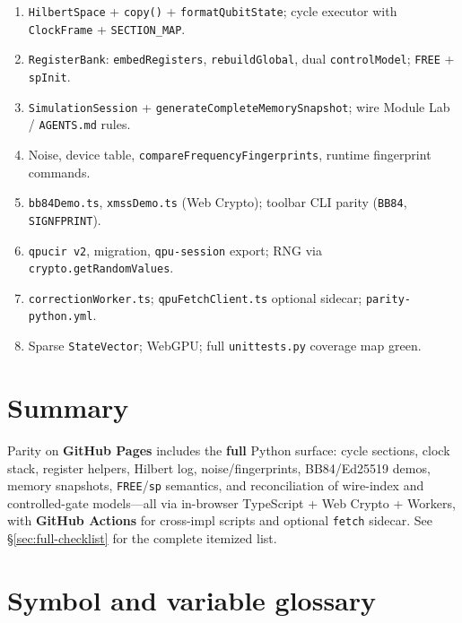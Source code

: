\documentclass[11pt,a4paper]{article}
\begin{document}
\begin{enumerate}[label=\textbf{Phase \Roman*.}]
  \item \texttt{HilbertSpace} + \texttt{copy()} + \texttt{formatQubitState}; cycle executor with \texttt{ClockFrame} + \texttt{SECTION\_MAP}.
  \item \texttt{RegisterBank}: \texttt{embedRegisters}, \texttt{rebuildGlobal}, dual \texttt{controlModel}; \texttt{FREE} + \texttt{spInit}.
  \item \texttt{SimulationSession} + \texttt{generateCompleteMemorySnapshot}; wire Module Lab / \texttt{AGENTS.md} rules.
  \item Noise, device table, \texttt{compareFrequencyFingerprints}, runtime fingerprint commands.
  \item \texttt{bb84Demo.ts}, \texttt{xmssDemo.ts} (Web Crypto); toolbar CLI parity (\texttt{BB84}, \texttt{SIGNFPRINT}).
  \item \texttt{qpucir v2}, migration, \texttt{qpu-session} export; RNG via \texttt{crypto.getRandomValues}.
  \item \texttt{correctionWorker.ts}; \texttt{qpuFetchClient.ts} optional sidecar; \texttt{parity-python.yml}.
  \item Sparse \texttt{StateVector}; WebGPU; full \texttt{unittests.py} coverage map green.
\end{enumerate}

\section{Summary}

Parity on \textbf{GitHub Pages} includes the \textbf{full} Python surface: cycle sections, clock stack, register helpers, Hilbert log, noise/fingerprints, BB84/Ed25519 demos, memory snapshots, \texttt{FREE}/\texttt{sp} semantics, and reconciliation of wire-index and controlled-gate models---all via in-browser TypeScript + Web Crypto + Workers, with \textbf{GitHub Actions} for cross-impl scripts and optional \texttt{fetch} sidecar. See \S\ref{sec:full-checklist} for the complete itemized list.

\appendix
\section{Symbol and variable glossary}
\label{app:glossary}
\end{document}
